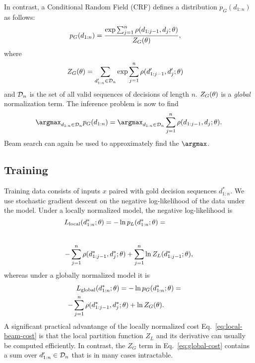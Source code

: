 In contrast, a Conditional Random Field (CRF) defines a distribution
$p_G(d_{1:n})$ as follows:
\begin{align}
  \label{eq:global-p}
  p_G(d_{1:n} {}) &= \frac{\exp \sum_{j=1}^n \rho(d_{1:j-1},d_j {; \theta}) }{Z_G({\theta})},
\end{align}
where
\begin{align*}
  Z_G({\theta}) &= \sum_{d'_{1:n}\in {\cal D}_n} \exp \sum_{j=1}^n \rho(d'_{1:j-1},d'_j {; \theta})
\end{align*}
and ${\cal D}_n$ is the set of all valid sequences of decisions of length $n$. 
$Z_G({\theta})$ is a {\em global} normalization term.
The inference problem is now to find
\begin{align*}
  \argmax_{d_{1:n}\in {\cal D}_n} p_G(d_{1:n} \cx) = 
  \argmax_{d_{1:n}\in {\cal D}_n} \sum_{j=1}^n \score(d_{1:j-1},d_j \xt).
\end{align*}
Beam search can again be used to approximately find the $\argmax$.

\subsection{Training}

Training data consists of inputs $x$ paired with gold decision
sequences $d_{1:n}^*$. We use stochastic gradient descent on the
negative log-likelihood of the data under the model. Under a locally normalized
model, the negative log-likelihood is
\begin{equation}
  \label{eq:local-beam-cost}
\hspace*{-1.4cm}  L_\mathrm{local}(d_{1:n}^*\cx;\theta) = 
  -\ln p_L(d_{1:n}^* \xt) = \end{equation} \\[-1cm]
\[  - \sum_{j=1}^n \rho(d_{1:j-1}^*,d_j^* {; \theta}) 
  + \sum_{j=1}^n \ln Z_L(d^*_{1:j-1} {; \theta}) , 
\] %
whereas under a globally normalized model it is
\begin{multline}
  \label{eq:global-cost}
  L_\mathrm{global}(d_{1:n}^*{} {; \theta}) =
  -\ln p_G(d_{1:n}^* {; \theta}) = \\
  - \sum_{j=1}^n \rho(d_{1:j-1}^*,d_j^* {; \theta}) 
  + \ln Z_G({\theta}). \hspace*{1.3cm}
\end{multline}
A significant practical advantange of the locally normalized cost
Eq.~\eqref{eq:local-beam-cost} is that the local partition function $Z_L$ 
and its derivative can usually be computed efficiently.
In contrast, the $Z_G$ term in Eq.~\eqref{eq:global-cost} 
contains a sum over $d'_{1:n}\in {\cal D}_n$ that is in many cases
intractable.

